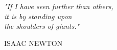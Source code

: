 
\chapter*{}

\begin{flushright}
	\small\em{
		"If I have seen further than others,\\it is by standing upon\\the shoulders of giants."
	}
\end{flushright}
\begin{flushright}
	\footnotesize{
		ISAAC NEWTON
	}
\end{flushright}

